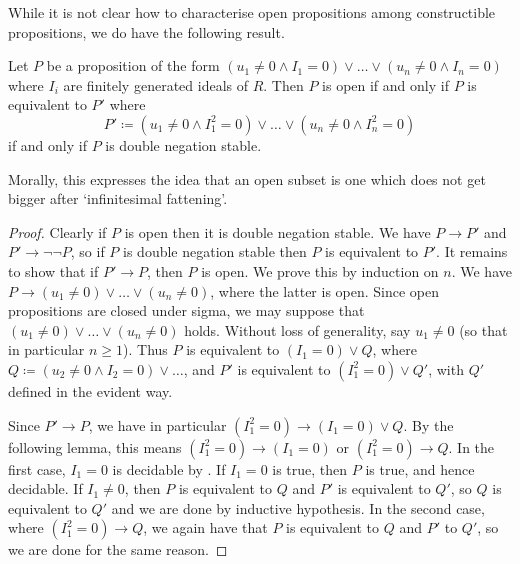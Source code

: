 While it is not clear how to characterise open propositions among constructible propositions,
we do have the following result.

\begin{lemma}
Let $P$ be a proposition of the form
$(u_1 \ne 0 \wedge I_1 = 0) \vee \ldots \vee (u_n \ne 0 \wedge I_n = 0)$
where $I_i$ are finitely generated ideals of $R$.
Then $P$ is open if and only if $P$ is equivalent to $P'$ where
\[P' \coloneqq (u_1 \ne 0 \wedge I_1^2 = 0) \vee \ldots \vee (u_n \ne 0 \wedge I_n^2 = 0)\]
if and only if $P$ is double negation stable.
\end{lemma}

Morally, this expresses the idea that an open subset is one which does not get bigger
after `infinitesimal fattening'.

\begin{proof}
Clearly if $P$ is open then it is double negation stable. 
We have $P \to P'$ and $P' \to \neg \neg P$,
so if $P$ is double negation stable then $P$ is equivalent to $P'$.
It remains to show that if $P' \to P$, then $P$ is open.
We prove this by induction on $n$.
We have $P \to (u_1 \ne 0) \vee \ldots \vee (u_n \ne 0)$, where
the latter is open. Since open propositions are closed under sigma, we may
suppose that $(u_1 \ne 0) \vee \ldots \vee (u_n \ne 0)$ holds.
Without loss of generality, say $u_1 \ne 0$ (so that in particular $n \ge 1$).
Thus $P$ is equivalent to
$(I_1 = 0) \vee Q$, where $Q \coloneqq (u_2 \ne 0 \wedge I_2 = 0) \vee \ldots$,
	and $P'$ is equivalent to $(I_1^2 = 0) \vee Q'$, with $Q'$ defined in
	the evident way.

	Since $P' \to P$, we have in particular $(I_1^2 = 0) \to (I_1 = 0) \vee Q$.
	By the following lemma, this means $(I_1^2 = 0) \to (I_1 = 0)$ or
	$(I_1^2 = 0) \to Q$. In the first case, $I_1 = 0$ is decidable by \cite{etale-draft}.
	If $I_1 = 0$ is true, then $P$ is true, and hence decidable.
	If $I_1 \ne 0$, then $P$ is equivalent to $Q$ and $P'$ is equivalent to $Q'$,
	so $Q$ is equivalent to $Q'$ and we are done by inductive hypothesis.
	In the second case, where $(I_1^2 = 0) \to Q$, we again have that
	$P$ is equivalent to $Q$ and $P'$ to $Q'$, so we are done for the same reason.
\end{proof}

